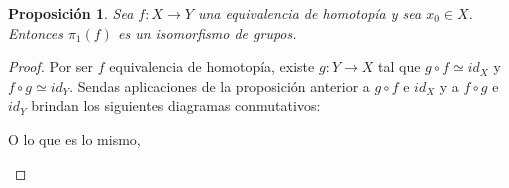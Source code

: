 \documentclass[11pt]{report}
\newtheorem{proposition}{Proposición}[chapter]
\theoremstyle{definition}
\theoremstyle{definition}
\theoremstyle{remark}
\begin{document}
\begin{proposition}
Sea $f \colon X \to Y$ una equivalencia de homotopía y sea $x_0 \in X$. Entonces $\pi_1(f)$ es un isomorfismo de grupos.
\end{proposition}

\begin{proof}
Por ser $f$ equivalencia de homotopía, existe $g \colon Y \to X$ tal que $g \circ f \simeq id_X$ y $f \circ g \simeq id_Y$. Sendas aplicaciones de la proposición anterior a $g \circ f$ e $id_X$ y a $f \circ g$ e $id_Y$ brindan los siguientes diagramas conmutativos:

\begin{center}
 \qquad
{}
\end{center}
O lo que es lo mismo,
\begin{center}
 \qquad
{}

\end{center}
\end{proof}
\end{document}
